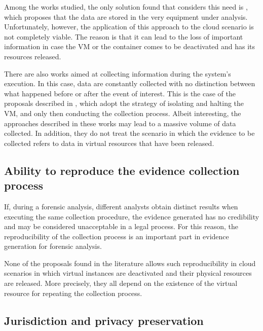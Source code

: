 \documentclass[conference]{IEEEtran}
\newcommand{\marcos}[1]{{\color{green}{MARCOS: #1}}}
\begin{document}
Among the works studied, the only solution found that considers this need is \cite{Dezfouli_Backup_approach:2012}, which proposes that the data are stored in the very equipment under analysis.
%
Unfortunately, however, the application of this approach to the cloud scenario is not completely viable.
%
The reason is that it can lead to the loss of important information in case the VM or the container comes to be deactivated and has its resources released.


There are also works aimed at collecting information during the system's execution.
%
In this case, data are constantly collected with no distinction between what happened before or after the event of interest.
%
This is the case of the proposals described in \cite{Poisel_VMI:2013,Dykstra_FROST:2013,Sang_Log_approach:2013}, which adopt the strategy of isolating and halting the VM, and only then conducting the collection process. 
%
Albeit interesting, the approaches described in these works may lead to a massive volume of data collected.
%
In addition, they do not treat the scenario in which the evidence to be collected refers to data in virtual resources that have been released.


\subsection{Ability to reproduce the evidence collection process}
\label{sec:related-reproducibility}
\marcos{OK: ``Collection process reproducible without VM''}


If, during a forensic analysis, different analysts obtain distinct results when executing the same collection procedure, the evidence generated has no credibility and may be considered unacceptable in a legal process. 
%
For this reason, the reproducibility of the collection process is an important part in evidence generation for forensic analysis.


None of the proposals found in the literature allows such reproducibility in cloud scenarios in which virtual instances are deactivated and their physical resources are released.
%
More precisely, they all depend on the existence of the virtual resource for repeating the collection process.



\subsection{Jurisdiction and privacy preservation}
\label{sec:related-privacy}
\end{document}
